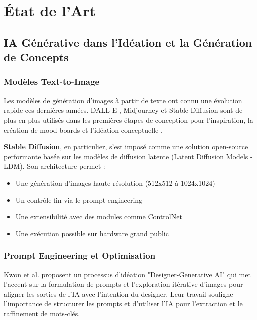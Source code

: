 \section{État de l'Art}

\subsection{IA Générative dans l'Idéation et la Génération de Concepts}

\subsubsection{Modèles Text-to-Image}

Les modèles de génération d'images à partir de texte ont connu une évolution rapide ces dernières années. DALL-E \cite{ramesh2021zero}, Midjourney et Stable Diffusion \cite{rombach2022high} sont de plus en plus utilisés dans les premières étapes de conception pour l'inspiration, la création de mood boards et l'idéation conceptuelle \cite{bartlett2024generative, takale2024advancements}.

\textbf{Stable Diffusion}, en particulier, s'est imposé comme une solution open-source performante basée sur les modèles de diffusion latente (Latent Diffusion Models - LDM). Son architecture permet :

\begin{itemize}[leftmargin=*]
    \item Une génération d'images haute résolution (512x512 à 1024x1024)
    \item Un contrôle fin via le prompt engineering
    \item Une extensibilité avec des modules comme ControlNet
    \item Une exécution possible sur hardware grand public
\end{itemize}

\subsubsection{Prompt Engineering et Optimisation}

Kwon et al. \cite{kwon2024designer} proposent un processus d'idéation "Designer-Generative AI" qui met l'accent sur la formulation de prompts et l'exploration itérative d'images pour aligner les sorties de l'IA avec l'intention du designer. Leur travail souligne l'importance de structurer les prompts et d'utiliser l'IA pour l'extraction et le raffinement de mots-clés.

